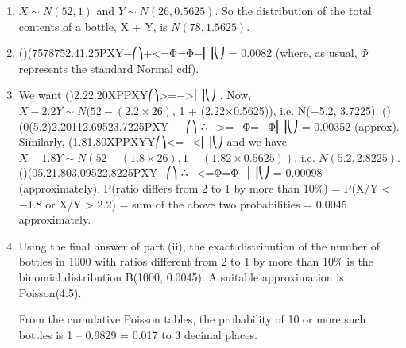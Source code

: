 \documentclass[a4paper,12pt]{article}
\begin{document}
\begin{enumerate}
    \item $X \sim N(52, 1)$ and $Y \sim N(26, 0.5625)$.
So the distribution of the total contents of a bottle, X + Y, is $N(78, 1.5625)$.
\item  ()(7578752.41.25PXY−⎛⎞+<=Φ=Φ−⎜⎟⎝⎠ = 0.0082
(where, as usual, $\Phi$ represents the standard Normal cdf).
\item  We want ()2.22.20XPPXY⎛⎞>=−>⎜⎟⎝⎠ .
Now, $X − 2.2Y \sim N(52 − (2.2×26)$, 1 + (2.22×0.5625)), i.e. N(−5.2, 3.7225).
()(0(5.2)2.20112.69523.7225PXY−−⎛⎞ ∴−>=−Φ=−Φ⎜⎟⎝⎠ = 0.00352 (approx).
Similarly, (1.81.80XPPXYY⎛⎞<=−<⎜⎟⎝⎠ and we have
$X − 1.8Y \sim N(52 − (1.8×26), 1 + (1.82×0.5625))$, i.e. $N(5.2, 2.8225)$.
()(05.21.803.09522.8225PXY−⎛⎞ ∴−<=Φ=Φ−⎜⎟⎝⎠ = 0.00098 (approximately).
P(ratio differs from 2 to 1 by more than 10\%) = P(X/Y < −1.8 or X/Y > 2.2)
= sum of the above two probabilities = 0.0045 approximately.
\item  Using the final answer of part (ii), the exact distribution of the number of bottles in 1000 with ratios different from 2 to 1 by more than 10\% is the binomial distribution B(1000, 0.0045).
A suitable approximation is Poisson(4.5).

From the cumulative Poisson tables, the probability of 10 or more such bottles is 1 – 0.9829 = 0.017 to 3 decimal places.

\end{enumerate}
\end{document}
